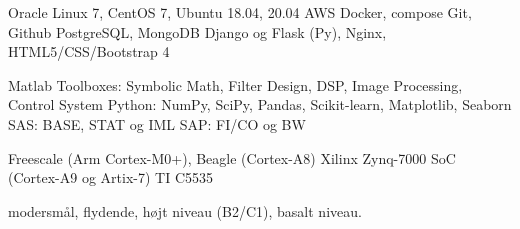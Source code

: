 \documentclass[a4paper]{janus-resume} %
\begin{document}
\begin{minipage}[t]{0.49\textwidth}
Oracle Linux 7, CentOS 7, Ubuntu 18.04, 20.04
\textbullet{} AWS
\textbullet{} Docker, compose
\textbullet{} Git, Github
\textbullet{} PostgreSQL, MongoDB
\textbullet{} Django og Flask (Py), Nginx, HTML5/CSS/Bootstrap 4
\sectionspace %

Matlab Toolboxes: Symbolic Math, Filter Design, DSP, Image Processing, Control System
\textbullet{} Python: NumPy, SciPy, Pandas, Scikit-learn, Matplotlib, Seaborn
\textbullet{} SAS: BASE, STAT og IML
\textbullet{} SAP: FI/CO og BW 
\sectionspace %

Freescale (Arm Cortex-M0+), Beagle (Cortex-A8)
\textbullet{} Xilinx Zynq-7000 SoC (Cortex-A9 og Artix-7)
\textbullet{} TI C5535 \\
\sectionspace %

\sectionspace %


 modersmål,
 flydende,
 højt niveau (B2/C1),
 basalt niveau.

\sectionspace %







\end{minipage} %
\end{document}

